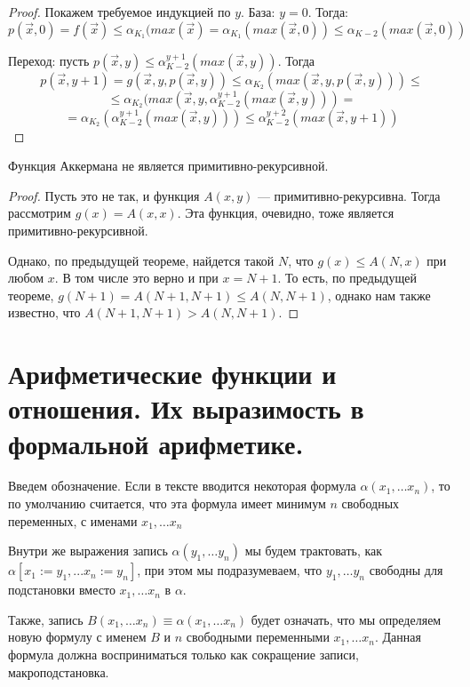 \begin{proof}
Покажем требуемое индукцией по $y$.
База: $y = 0$. Тогда: $$p(\overrightarrow{x},0) = f(\overrightarrow{x}) \le 
\alpha_{K_1}(max(\overrightarrow{x}) = \alpha_{K_1}(max(\overrightarrow{x},0)) \le 
\alpha_{K-2}(max(\overrightarrow{x},0))$$

Переход: пусть $p(\overrightarrow{x},y) \le \alpha^{y+1}_{K-2}(max(\overrightarrow{x},y))$.
Тогда $$p(\overrightarrow{x},y+1) = g(\overrightarrow{x},y,p(\overrightarrow{x},y))
\le \alpha_{K_2}(max(\overrightarrow{x},y,p(\overrightarrow{x},y))) \le$$
$$\le \alpha_{K_2}(max(\overrightarrow{x},y,\alpha^{y+1}_{K-2}(max(\overrightarrow{x},y))) =$$
$$= \alpha_{K_2}(\alpha^{y+1}_{K-2}(max(\overrightarrow{x},y)))
\le \alpha^{y+2}_{K-2}(max(\overrightarrow{x},y+1))$$
\end{proof}

\begin{theorem}
Функция Аккермана не является примитивно-рекурсивной.
\end{theorem}

\begin{proof}
Пусть это не так, и функция $A(x,y)$ --- примитивно-рекурсивна.
Тогда рассмотрим $g(x) = A(x,x)$. Эта функция, очевидно, тоже является 
примитивно-рекурсивной. 

Однако, по предыдущей теореме, найдется такой $N$, что $g(x) \le A(N,x)$
при любом $x$. В том числе это верно и при $x=N+1$.
То есть, по предыдущей теореме, $g(N+1) = A(N+1,N+1) \le A(N,N+1)$, 
однако нам также известно, что $A(N+1,N+1) > A(N,N+1)$.
\end{proof}

\section{Арифметические функции и отношения. Их выразимость в формальной арифметике.}

Введем обозначение. Если в тексте вводится некоторая формула $\alpha(x_1, \dots x_n)$, то
по умолчанию считается, что эта формула имеет минимум $n$ свободных переменных, с именами
$x_1, \dots x_n$

Внутри же выражения запись $\alpha (y_1, \dots y_n)$ мы будем трактовать, как 
$\alpha [x_1 := y_1, ... x_n := y_n]$, при этом
мы подразумеваем, что $y_1, \dots y_n$ свободны для подстановки вместо $x_1, \dots x_n$ в $\alpha$.

Также, запись $B(x_1, \dots x_n) \equiv \alpha(x_1, \dots x_n)$ будет означать, что мы определяем
новую формулу с именем $B$ и $n$ свободными переменными $x_1, \dots x_n$. 
Данная формула должна восприниматься только как сокращение записи, макроподстановка.

